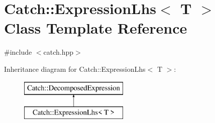 \hypertarget{classCatch_1_1ExpressionLhs}{\section{Catch\-:\-:Expression\-Lhs$<$ T $>$ Class Template Reference}
\label{classCatch_1_1ExpressionLhs}
}


{\ttfamily \#include $<$catch.\-hpp$>$}

Inheritance diagram for Catch\-:\-:Expression\-Lhs$<$ T $>$\-:\begin{figure}[H]
\begin{center}
\leavevmode
\includegraphics[height=2.000000cm]{classCatch_1_1ExpressionLhs}
\end{center}
\end{figure}
